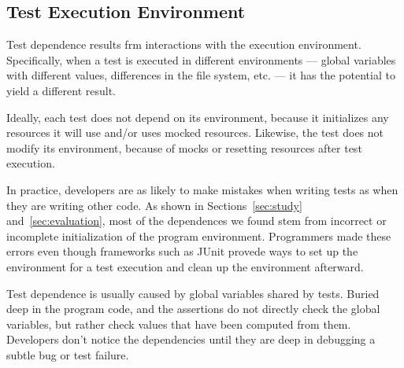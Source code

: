 \subsection{Test Execution Environment}

Test dependence results frm interactions with the execution environment.
Specifically, when a
test is executed in different environments --- global variables
with different values, differences in the file system, etc. --- it has the
potential to yield
a different result.  

Ideally, each test does not depend on its environment, because it
initializes any resources it will use and/or uses mocked resources.
Likewise, the test does not modify its environment, because of mocks or
resetting resources after test execution.

In practice, developers are as likely
to make mistakes when writing tests as when they are writing other code.
As shown in Sections~\ref{sec:study} and~\ref{sec:evaluation}, most of the dependences we found
stem from incorrect or incomplete initialization
of the program environment.
Programmers made these errors even though frameworks such as
JUnit provede ways to set up the environment for a test execution and clean
up the environment afterward.




Test dependence is usually caused by
global variables shared by tests.
Buried deep in the program code, and the assertions
do not directly check the global variables,
but rather check values that have been computed from
them.
Developers don't notice the dependencies until they are deep in debugging a
subtle bug or test failure.

